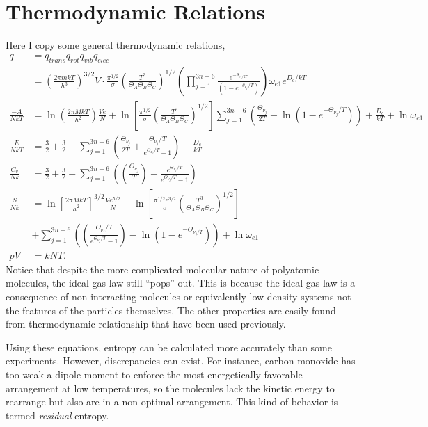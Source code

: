 \section{Thermodynamic Relations}%
\label{sec:polytr}
Here I copy some general thermodynamic relations,
\begin{align*}
	q &= q_{trans} q_{rot} q_{vib} q_{elec}\\
	  &= {\left(\frac{2\pi mkT}{h^3}\right)}^{3/2}V \cdot
		 \frac{\pi^{1/2}}{\sigma}
		 {\left(\frac{T^3}{\Theta_A \Theta_B \Theta_{C}}\right)}^{1/2}
		 {\left(\prod_{j=1}^{3n-6}{\frac{e^{-\theta_{\nu_{j}/2T}}}{(1 -
		 e^{-\theta_{\nu_{j}}/T})}}\right)}
		 \omega_{e1} e^{D_o /kT}\\
	\frac{-A}{NkT} &= \ln{\left(\frac{2\pi MkT}{h^2}\right)}
		 \frac{Ve}{N} + \ln{\left[\frac{\pi^{1/2}}{\sigma}
		 {\left(\frac{T^3}{\Theta_A \Theta_B \Theta_{C}}\right)}^{1/2}
		 \right]}
		 \sum_{j=1}^{3n-6}{\left(\frac{\Theta_{\nu_j}}{2T} +
		 \ln{(1 - e^{-\Theta_{\nu_j}/T})}\right)} +
		 \frac{D_e}{kT} + \ln{\omega_{e1}}\\
	\frac{E}{NkT} &= \frac{3}{2} + \frac{3}{2} +
		\sum_{j=1}^{3n-6}{\left(\frac{\Theta_{\nu_j}}{2T} +
		\frac{\Theta_{\nu_j}/T}{e^{\Theta_{\nu_j}/T} - 1}\right)}-
		\frac{D_e}{kT}\\
	\frac{C_v}{Nk} &= \frac{3}{2} + \frac{3}{2} + 
		\sum_{j=1}^{3n-6}{\left({\left(\frac{\Theta_{\nu_j}}{T}\right)} +
		\frac{e^{\Theta_{\nu_j}/T}}{e^{\Theta_{\nu_j}/T} - 1}\right)}\\
	\frac{S}{Nk} &= \ln{\left[\frac{2\pi MkT}{h^{2}}\right]}^{3/2}
	\frac{Ve^{5/2}}{N} + \ln{\left[\frac{\pi^{1/2} e^{3/2}}{\sigma}
	{\left(\frac{T^3}{\Theta_A \Theta_B \Theta_{C}}\right)}^{1/2}\right]}\\
	&+ \sum_{j=1}^{3n-6}{\left({\left(\frac{\Theta_{\nu_j}/T}%
	{e^{\Theta_{\nu_j}/T} - 1}\right)} - \ln{(1 -
	e^{-\Theta_{\nu_{j}/T}})}\right)} + \ln{\omega_{e1}}\\
	pV &= kNT.
\end{align*}
Notice that despite the more complicated molecular nature of polyatomic
molecules, the ideal gas law still ``pops'' out. This is because the ideal gas
law is a consequence of non interacting molecules or equivalently low density
systems not the features of the particles themselves. The other properties are
easily found from thermodynamic relationship that have been used previously.

Using these equations, entropy can be calculated more accurately than some
experiments. However, discrepancies can exist. For instance, carbon monoxide has
too weak a dipole moment to enforce the most energetically favorable arrangement
at low temperatures, so the molecules lack the kinetic energy to rearrange but
also are in a non-optimal arrangement. This kind of behavior is termed
\textit{residual} entropy.
